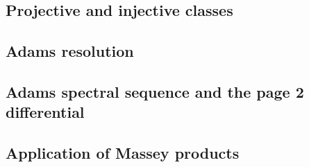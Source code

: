 \subsection{Projective and injective classes}


\subsection{Adams resolution}


\subsection{Adams spectral sequence and the page 2 differential}


\subsection{Application of Massey products}
